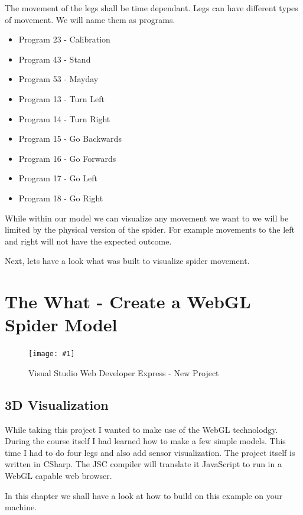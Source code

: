 \documentclass[12pt,leqno]{book}
\newcommand{\png}[1]{\texttt{[image: \#1]}}
\newcommand{\figpng}[2]{\begin{figure}[htb]\centering\png{#1}\caption{#2}\end{figure}}
\begin{document}
The movement of the legs shall be time dependant. Legs can have different types of movement. We will name them as programs.



\begin{itemize}
\item Program 23 - Calibration
\item Program 43 - Stand
\item Program 53 - Mayday
\item Program 13 - Turn Left
\item Program 14 - Turn Right
\item Program 15 - Go Backwards
\item Program 16 - Go Forwards
\item Program 17 - Go Left
\item Program 18 - Go Right
\end{itemize}

While within our model we can visualize any movement we want to we will be limited by the physical version of the spider.
For example movements to the left and right will not have the expected outcome. 

Next, lets have a look what was built to visualize spider movement.








\chapter{The What - Create a WebGL Spider Model}
\figpng{Images/New_Project-2012-03-13_09.19.10}
{Visual Studio Web Developer Express - New Project}

\section{3D Visualization}
While taking this project I wanted to make use of the WebGL technolodgy. During the course itself I had learned how to make a few simple models. This time I had to do four legs and also add sensor visualization. The project itself is written in CSharp. The JSC compiler will translate it JavaScript to run in a WebGL capable web browser.


In this chapter we shall have a look at how to build on this example on your machine.
\end{document}
